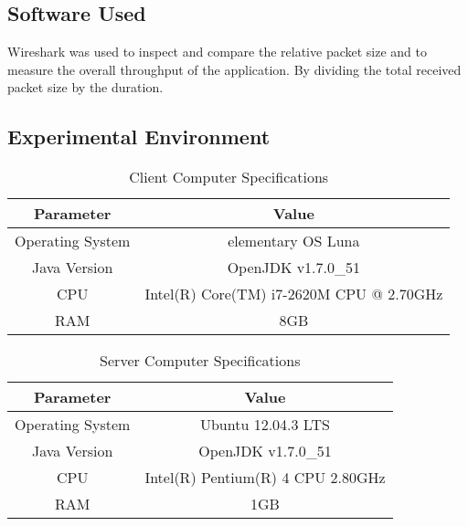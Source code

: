 \documentclass{article}
\begin{document}
\subsection{Software Used}
\begin{description}
\item{Wireshark} was used to inspect and compare the relative packet size and to measure the overall throughput of the application. By dividing the total received packet size by the duration. 
\end{description}

\subsection{Experimental Environment}
\begin{table}[h]
\begin{tabular}{|c|c|}
\hline
Parameter        & Value                                    \\ \hline
Operating System & elementary OS Luna     					\\ \hline
Java Version     & OpenJDK v1.7.0\_51                       \\ \hline
CPU              & Intel(R) Core(TM) i7-2620M CPU @ 2.70GHz \\ \hline
RAM              & 8GB                                      \\ \hline
\end{tabular}
\caption {Client Computer Specifications}
\end{table}


\begin{table}[h]
\begin{tabular}{|c|c|}
\hline
Parameter        & Value                                    \\ \hline
Operating System & Ubuntu 12.04.3 LTS    					\\ \hline
Java Version     & OpenJDK v1.7.0\_51                       \\ \hline
CPU              & Intel(R) Pentium(R) 4 CPU 2.80GHz 		\\ \hline
RAM              & 1GB                                      \\ \hline
\end{tabular}
\caption {Server Computer Specifications}
\end{table}

\end{document}
